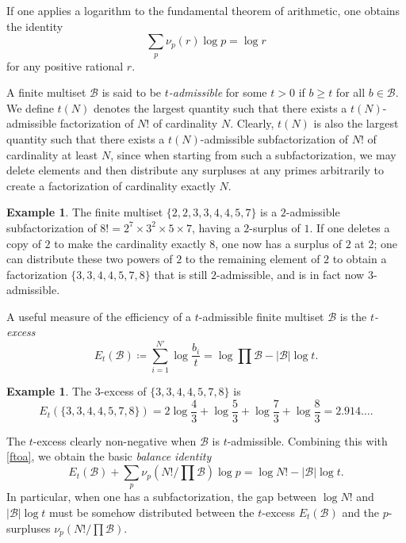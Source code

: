 \documentclass[12pt,a4paper,reqno]{amsart}
\numberwithin{equation}{section}
\theoremstyle{plain}
\theoremstyle{definition}
\newtheorem{example}[theorem]{Example}
\newcommand\tuple{{\mathcal B}}
\begin{document}
If one applies a logarithm to the fundamental theorem of arithmetic, one obtains the identity
\begin{equation}\label{ftoa}
  \sum_p \nu_p(r) \log p = \log r
\end{equation}
for any positive rational $r$.

A finite multiset $\tuple$ is said to be \emph{$t$-admissible} for some $t>0$ if $b \geq t$ for all $b \in \tuple$.  We define $t(N)$ denotes the largest quantity such that there exists a $t(N)$-admissible factorization of $N!$ of cardinality $N$.  Clearly, $t(N)$ is also the largest quantity such that there exists a $t(N)$-admissible subfactorization of $N!$ of cardinality at least $N$, since when starting from such a subfactorization, we may delete elements and then distribute any surpluses at any primes arbitrarily to create a factorization of cardinality exactly $N$.

\begin{example}  The finite multiset $\{2,2,3,3,4,4,5,7\}$ is a $2$-admissible subfactorization of $8! = 2^7 \times 3^2 \times 5 \times 7$, having a $2$-surplus of $1$. If one deletes a copy of $2$ to make the cardinality exactly $8$, one now has a surplus of $2$ at $2$; one can distribute these two powers of $2$ to the remaining element of $2$ to obtain a factorization $\{ 3,3,4,4,5,7,8\}$ that is still $2$-admissible, and is in fact now $3$-admissible.
\end{example}

A useful measure of the efficiency of a $t$-admissible finite multiset $\tuple$ is the \emph{$t$-excess}
$$ E_t(\tuple) \coloneqq \sum_{i=1}^{N'} \log \frac{b_i}{t}
= \log \prod \tuple - |\tuple| \log t.$$

\begin{example}  The $3$-excess of $\{ 3,3,4,4,5,7,8\}$ is
$$ E_t(\{3,3,4,4,5,7,8\}) = 2 \log \frac{4}{3}  + \log \frac{5}{3} + \log \frac{7}{3} + \log \frac{8}{3} = 2.914\dots.$$
\end{example}

The $t$-excess clearly non-negative when $\tuple$ is $t$-admissible.
Combining this with \eqref{ftoa}, we obtain the basic \emph{balance identity}
\begin{equation}\label{excess-identity}
E_t(\tuple) + \sum_p \nu_p(N!/\prod\tuple) \log p = \log N! - |\tuple| \log t.
\end{equation}
In particular, when one has a subfactorization, the gap between $\log N!$ and $|\tuple| \log t$ must be somehow distributed between the $t$-excess $E_t(\tuple)$ and the $p$-surpluses $\nu_p(N!/\prod\tuple)$.  
\end{document}
